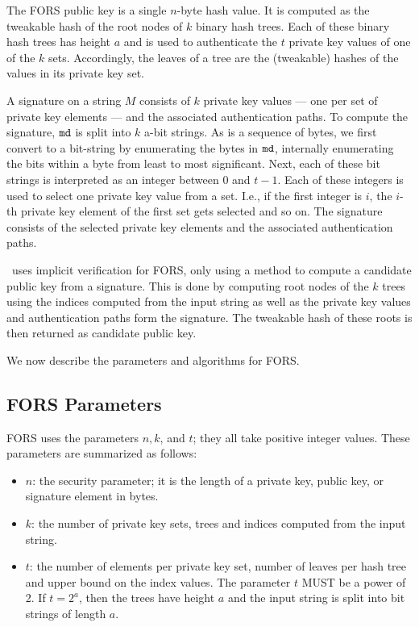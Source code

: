 The FORS public key is a single $n$-byte hash value. It is computed as the tweakable hash of the root nodes of $k$ binary hash trees. Each of these binary hash trees has height $a$ and is used to authenticate the $t$ private key values of one of the $k$ sets. Accordingly, the leaves of a tree are the (tweakable) hashes of the values in its private key set.

A signature on a string $M$ consists of $k$ private key values --- one per set of private key elements --- and the associated authentication paths. To compute the signature, $\mathtt{md}$ is split into $k$ a-bit strings. As \md is a sequence of bytes, we first convert to a bit-string by enumerating the bytes in $\mathtt{md}$, internally enumerating the bits within a byte from least to most significant. Next, each of these bit strings is interpreted as an integer between $0$ and $t-1$. Each of these integers is used to select one private key value from a set. I.e., if the first integer is $i$, the $i$-th private key element of the first set gets selected and so on. The signature consists of the selected private key elements and the associated authentication paths.

\SPHINCSA\ uses implicit verification for FORS, only using a method to compute a candidate public key from a signature. This is done by computing root nodes of the $k$ trees using the indices computed from the input string as well as the private key values and authentication paths form the signature. The tweakable hash of these roots is then returned as candidate public key.

We now describe the parameters and algorithms for FORS.

\subsection{FORS Parameters}
\label{sec:forspara}
FORS uses the parameters $n, k$, and $t$; they all take positive integer values. These parameters are summarized as follows:

\begin{itemize}
    \item $ n$: the security parameter; it is the length of a private key, public key, or signature element in bytes.

    \item $ k$: the number of private key sets, trees and indices computed from the input string.
    
    \item $ t$: the number of elements per private key set, number of leaves per hash tree and upper bound on the index values. The parameter $t$ MUST be a power of 2. If $t=2^{a}$, then the trees have height $a$ and the input string is split into bit strings of length $a.$
\end{itemize}


